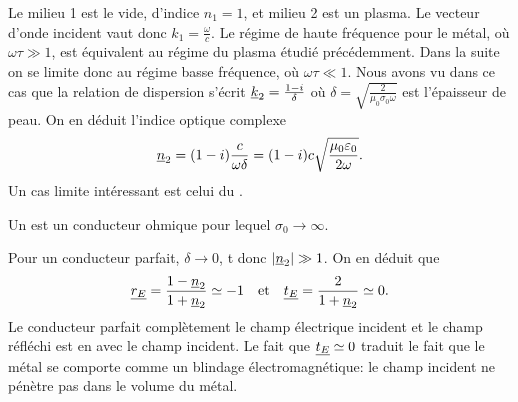 \documentclass[12pt,fancy]{cours}%
\begin{document}

Le milieu 1 est le vide, d’indice $n_1=1$, et milieu 2 est un plasma. Le vecteur d’onde incident vaut donc $k_1=\frac{\omega}{c}$. Le régime de haute fréquence pour le métal, où $\omega\tau\gg 1$, est équivalent au régime du plasma étudié précédemment.
Dans la suite on se limite donc au régime basse fréquence, où $\omega\tau\ll 1$. Nous avons vu dans ce cas que la relation de dispersion s’écrit $\underline{k}_2=\frac{1-i}{\delta}$ où $\delta=\sqrt{\frac{2}{\mu_0\sigma_0\omega}}$ est l’épaisseur de peau. On en déduit l’indice optique complexe
\begin{equation}
  \underline{n}_2=(1-i)\frac{c}{\omega\delta} =  (1-i)c\sqrt{\frac{\mu_0 \varepsilon_0}{2\omega}}.
\end{equation}
Un cas limite intéressant est celui du .
\begin{definition}\label{def:}
Un  est un conducteur ohmique pour lequel $\sigma_0\to\infty$.
\end{definition}
Pour un conducteur parfait, $\delta\to 0$, t donc $|\underline{n}_2|\gg 1$. On en déduit que
\begin{equation}
\underline{r_{E}}=\frac{1-\underline{n}_2}{1+\underline{n}_2}\simeq -1\quad\text{et}\quad \underline{t_{E}}=\frac{2}{1+\underline{n}_2}\simeq 0.
\end{equation}
Le conducteur parfait  complètement le champ électrique incident et le champ réfléchi est en  avec le champ incident. Le fait que $\underline{t_{E}}\simeq 0$ traduit le fait que le métal se comporte comme un blindage électromagnétique: le champ incident ne pénètre pas dans le volume du métal.
\end{document}
